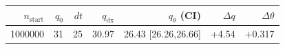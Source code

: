 \begin{tabular}{r r r r r r r}
\hline
$n_{\mathrm{start}}$ & $q_0$ & $dt$ & $q_{\mathrm{dx}}$ & $q_{\theta}$ (CI) & $\Delta q$ & $\Delta\theta$ \\
\hline
1000000 & 31 & 25 & 30.97 & 26.43 [26.26,26.66] & +4.54 & +0.317 \\
\hline
\end{tabular}
